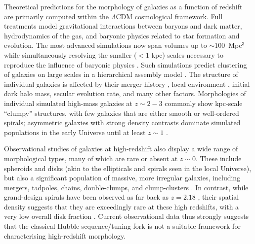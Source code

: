 \documentclass[a4paper,fleqn,usenatbib]{mnras}
\begin{document}
Theoretical predictions for the morphology of galaxies as a function of
redshift are primarily computed within the $\Lambda$CDM cosmological framework.
Full treatments model gravitational interactions between baryons and dark
matter, hydrodynamics of the gas, and baryonic physics related to star
formation and evolution. The most advanced simulations now span volumes up to
$\sim100$~Mpc$^3$ while simultaneously resolving the smaller ($<1$ kpc) scales
necessary to reproduce the influence of baryonic physics \citep{vog14a,sch15}.
Such simulations predict clustering of galaxies on large scales in a
hierarchical assembly model \citep{sil12}. The structure of individual galaxies
is affected by their merger history \citep{too72,ste02,hop10,kav14a,kav14}, local
environment \citep[\eg, the morphology-density relation;][]{dre80}, initial
dark halo mass, secular evolution rate, and many other factors. Morphologies of
individual simulated high-mass galaxies at $z\sim2-3$ commonly show kpc-scale
``clumpy'' structures, with few galaxies that are either smooth or well-ordered
spirals; asymmetric galaxies with strong density contrasts dominate simulated
populations in the early Universe until at least $z\sim1$ \citep{bel12,gen14}. 

Observational studies of galaxies at high-redshift also display a wide range of
morphological types, many of which are rare or absent at $z\sim0$.  These
include spheroids and disks (akin to the ellipticals and spirals seen in the
local Universe), but also a significant population of massive, more irregular
galaxies, including mergers, tadpoles, chains, double-clumps, and
clump-clusters \citep{elm05,elm07,cam11a,for11a,kar15}.  In contrast, while
grand-design spirals have been observed as far back as $z=2.18$ \citep{law12},
their spatial density suggests that they are exceedingly rare at these high
redshifts, with a very low overall disk fraction \citep{mor13}. Current
observational data thus strongly suggests that the classical Hubble
sequence/tuning fork \citep{hub36} is not a suitable framework for
characterising high-redshift morphology. 
\end{document}
